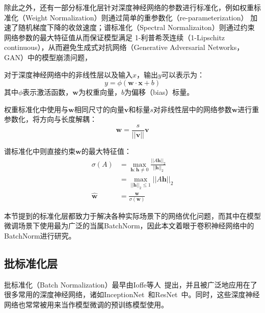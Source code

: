 除此之外，还有一部分标准化层针对深度神经网络的参数进行标准化，例如权重标准化（Weight Normalization）\citep{Salimans2016Weight}则通过简单的重参数化（re-parameterization）
加速了随机梯度下降的收敛速度；谱标准化（Spectral Normalizaiton）\citep{miyato_spectral_2018}则通过约束网络参数的最大特征值从而保证模型满足
1-利普希茨连续（1-Lipschitz continuous），从而避免生成式对抗网络（Generative Adversarial Networks，GAN）中的模型崩溃问题，

\begin{definition}[权重标准化与谱标准化]
    对于深度神经网络中的非线性层以及输入$x$，输出$y$可以表示为：
    \begin{equation}
        y=\phi(\mathbf{w}\cdot \mathbf{x} + b)
    \end{equation}
    其中$\phi$表示激活函数，$\mathbf{w}$为权重向量，$b$为偏移（bias）标量。

    权重标准化中使用与$\mathbf{w}$相同尺寸的向量$\mathbf{v}$和标量$s$对非线性层中的网络参数$\mathbf{w}$进行重参数化，将方向与长度解耦：
    \begin{equation}
        \mathbf{w}=\frac{s}{\vert \vert \mathbf{v} \vert \vert} \mathbf{v}
    \end{equation}

    谱标准化中则直接约束$\mathbf{w}$的最大特征值：
    \begin{equation}
        \begin{aligned}
            \sigma(A) &= \mathop {\max} \limits_{ \symbf{h}:\symbf{h} \neq 0 } \frac{\vert\vert A\symbf{h} \vert\vert_2}{\vert\vert \symbf{h} \vert\vert_2} \\
                        &= \mathop {\max} \limits_{\vert\vert \symbf{h} \vert\vert_2 \leq 1 } \vert\vert A\symbf{h} \vert\vert_2\\
            \hat{\mathbf{w}} &= \frac{\mathbf{w}}{\sigma(\mathbf{w}) } 
        \end{aligned}
    \end{equation}
\end{definition}

本节提到的标准化层都致力于解决各种实际场景下的网络优化问题，而其中在模型微调场景下使用最为广泛的当属BatchNorm，因此本文着眼于卷积神经网络中的BatchNorm进行研究。

\subsection{批标准化层}
\label{section:bn}


批标准化（Batch Normalization）最早由Ioffe等人~\citep{ioffe2015BN}提出，并且被广泛地应用在了很多常用的深度神经网络，诸如InceptionNet~\citep{szegedy_going_2015}和ResNet~\citep{he2016deep}中。同时，这些深度神经
网络也常常被用来当作模型微调的预训练模型使用。

